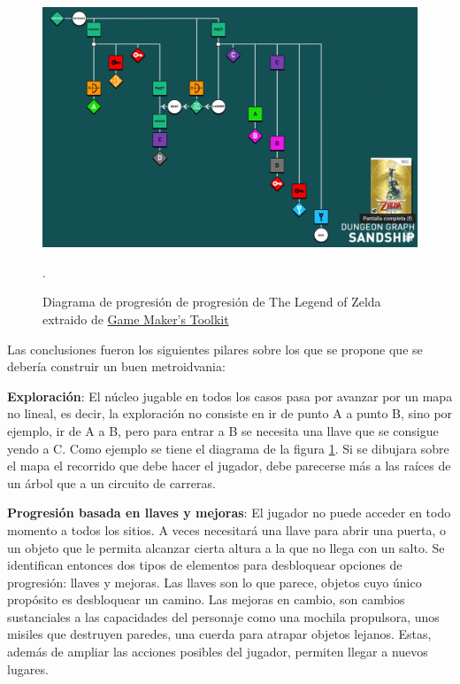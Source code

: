\begin{figure}[h]
    \centering
    \includegraphics[scale=0.28]{img/mark-brown.png}
    \caption[Diagrama de progresión de una mazmorra de The Legend of Zelda]{Diagrama de progresión de progresión de The Legend of Zelda extraido de \href{https://www.youtube.com/@GMTK}{Game Maker's Toolkit}}.
    \label{fig:markbrown}
\end{figure}

Las conclusiones fueron los siguientes pilares sobre los que se propone que se debería construir un buen metroidvania:

\textbf{Exploración}: El núcleo jugable en todos los casos pasa por avanzar por un mapa no lineal, es decir, la exploración no consiste en ir de punto A a punto B, sino por ejemplo, ir de A a B, pero para entrar a B se necesita una llave que se consigue yendo a C. Como ejemplo se tiene el diagrama de la figura \ref{fig:markbrown}. Si se dibujara sobre el mapa el recorrido que debe hacer el jugador, debe parecerse más a las raíces de un árbol que a un circuito de carreras.


\textbf{Progresión basada en llaves y mejoras}: El jugador no puede acceder en todo momento a todos los sitios. A veces necesitará una llave para abrir una puerta, o un objeto que le permita alcanzar cierta altura a la que no llega con un salto. Se identifican entonces dos tipos de elementos para desbloquear opciones de progresión: llaves y mejoras. Las llaves son lo que parece, objetos cuyo único propósito es desbloquear un camino. Las mejoras en cambio, son cambios sustanciales a las capacidades del personaje como una mochila propulsora, unos misiles que destruyen paredes, una cuerda para atrapar objetos lejanos. Estas, además de ampliar las acciones posibles del jugador, permiten llegar a nuevos lugares.


